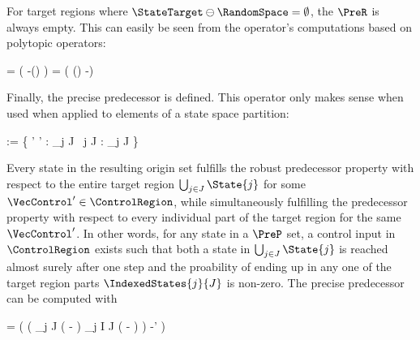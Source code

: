     For target regions where $\StateTarget \ominus \RandomSpace = \emptyset$, the $\PreR$ is always empty.
    This can easily be seen from the operator's computations based on polytopic operators:

    \startformula
        \startalign[n=2,align={right,left}]
            \NC {} =
            \NC \StateRegion \cap \Big( \StateTarget \oplus -(\MatB \ControlRegion \oplus \RandomSpace) \Big) \MatA \EndAnd
            \NR
            \NC {} =
            \NC \StateRegion \cap \Big( (\StateTarget \ominus \RandomSpace) \oplus -\MatB \ControlRegion \Big) \MatA \EndPeriod
            \NR
        \stopalign
    \stopformula

    Finally, the precise predecessor is defined.
    This operator only makes sense when used when applied to elements of a state space partition:

    \startformula
        \startalign[n=2,align={right,left}]
            \NC {} := \Big\{ \VecState \in \StateRegion \Bigmid \exists \VecControl' \in \ControlSpace' :
            \NC {} \subseteq \bigcup_{j \in J}  \;
            \NR
            \NC \empty
            \NC ~\forall j \in J :  \cap \bigcup_{j \in J}  \neq \emptyset \Big\} \EndPeriod
            \NR
        \stopalign
    \stopformula

    Every state in the resulting origin set fulfills the robust predecessor property with respect to the entire target region $\bigcup_{j \in J} \State{j}$ for some $\VecControl' \in \ControlRegion$, while simultaneously fulfilling the predecessor property with respect to every individual part of the target region for the same $\VecControl'$.
    In other words, for any state in a $\PreP$ set, a control input in $\ControlRegion$ exists such that both a state in $\bigcup_{j \in J} \State{j}$ is reached almost surely after one step and the proability of ending up in any one of the target region parts $\IndexedStates{j}{J}$ is non-zero.
    The precise predecessor can be computed with

    \startformula
         =
        \StateRegion \cap \Big( \Big( \bigcap_{j \in J} ( \oplus - \RandomSpace) \setminus \bigcup_{j \in I \setminus J} (  \oplus - \RandomSpace ) \Big) \oplus -\MatB \ControlSpace' \Big) \MatA \EndComma
    \stopformula

